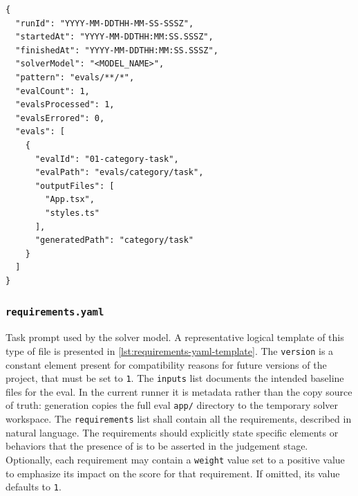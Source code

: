 \documentclass[11pt]{article}
\begin{document}
\begin{listing}[h]
\begin{tcolorbox}[colback=gray!20,  %
                  colframe=gray!60, %
                  rounded corners,   %
                  boxrule=0.5mm,    %
                  left=4mm, right=4mm, top=2mm, bottom=2mm, %
                  title=\texttt{manifest.json} contract]    %
\begin{verbatim}
{
  "runId": "YYYY-MM-DDTHH-MM-SS-SSSZ",
  "startedAt": "YYYY-MM-DDTHH:MM:SS.SSSZ",
  "finishedAt": "YYYY-MM-DDTHH:MM:SS.SSSZ",
  "solverModel": "<MODEL_NAME>",
  "pattern": "evals/**/*",
  "evalCount": 1,
  "evalsProcessed": 1,
  "evalsErrored": 0,
  "evals": [
    {
      "evalId": "01-category-task",
      "evalPath": "evals/category/task",
      "outputFiles": [
        "App.tsx",
        "styles.ts"
      ],
      "generatedPath": "category/task"
    }
  ]
}
\end{verbatim}
\end{tcolorbox}
\caption{The contract of \texttt{manifest.json} file, an artifact of the generation stage.}
\label{lst:manifest-json}
\end{listing}

\subsubsection{\texttt{requirements.yaml}}
\label{sec:judgement-reqs}

Task prompt used by the solver model. A representative logical template of this type of file is presented in \cref{lst:requirements-yaml-template}.
The \texttt{version} is a constant element present for compatibility reasons for future versions of the project, that must be set to \texttt{1}.
The \texttt{inputs} list documents the intended baseline files for the eval. In the current runner it is metadata rather than the copy source of truth: generation copies the full eval \texttt{app/} directory to the temporary solver workspace.
The \texttt{requirements} list shall contain all the requirements, described in natural language. The requirements should explicitly state specific elements or behaviors that the presence of is to be asserted in the judgement stage.
Optionally, each requirement may contain a \texttt{weight} value set to a positive value to emphasize its impact on the score for that requirement. If omitted, its value defaults to \texttt{1}.
\end{document}
